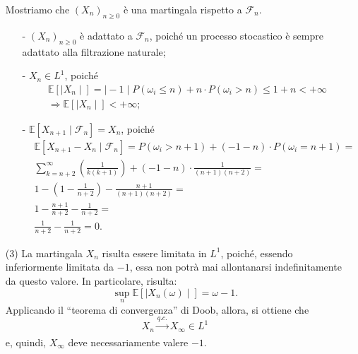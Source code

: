 \documentclass[11pt,largemargins]{homework}
\begin{document}
\begin{enumerate}
 
 Mostriamo che $\left(X_{n}\right)_{n\geq 0}$ è una martingala rispetto a $\mathcal{F}_{n}$.
 \begin{itemize}
 \item[-]
 $\left(X_{n}\right)_{n\geq 0}$ è adattato a $\mathcal{F}_{n}$, poiché un processo stocastico è sempre adattato alla filtrazione naturale;
 \item[-]
 $X_{n}\in L^{1}$, poiché
 \begin{align*}
  &\mathbb{E}[\mid X_{n}\mid]=\mid -1\mid P\left(\omega_{i}\leq n\right)+n\cdot P\left(\omega_{i}>n\right)\leq 1+ n < +\infty\\
  &\Rightarrow \mathbb{E}[\mid X_{n}\mid] < +\infty;
   \end{align*}
   \item[-]
   $\mathbb{E}[X_{n+1}\mid \mathcal{F}_{n}]=X_{n}$, poiché
   \begin{align*}
&\mathbb{E}[X_{n+1}-X_{n}\mid \mathcal{F}_{n}]=P\left(\omega_{i}> n+1\right)+\left(-1-n\right)\cdot P\left(\omega_{i}=n+1\right)=\\
 &\sum_{k=n+2}^{\infty}\left(\frac{1}{k\left(k+1\right)}\right)+\left(-1-n\right)\cdot\frac{1}{\left(n+1\right)\left(n+2\right)}=\\
& 1-\left(1-\frac{1}{n+2}\right)-\frac{n+1}{\left(n+1\right)\left(n+2\right)}=\\
 &1-\frac{n+1}{n+2}-\frac{1}{n+2}=\\
 &\frac{1}{n+2}-\frac{1}{n+2}=0.     
 \end{align*}
 \end{itemize}
 \item[(3)]
 La martingala $X_{n}$ risulta essere limitata in $L^{1}$, poiché, essendo inferiormente limitata da $-1$, essa non potrà mai allontanarsi indefinitamente da questo valore. In particolare, risulta:
 \begin{equation*}
 \sup_{n}{\mathbb{E}[\mid X_{n}\left(\omega\right)\mid]}=\omega - 1.
 \end{equation*}
 Applicando il ``teorema di convergenza'' di Doob, allora, si ottiene che
 \begin{equation*}
 X_{n}\xrightarrow[]{q.c.}X_{\infty} \in L^{1}
 \end{equation*}
 e, quindi, $X_{\infty}$ deve necessariamente valere $-1$.
  \end{enumerate}
  
   \newpage
\end{document}
